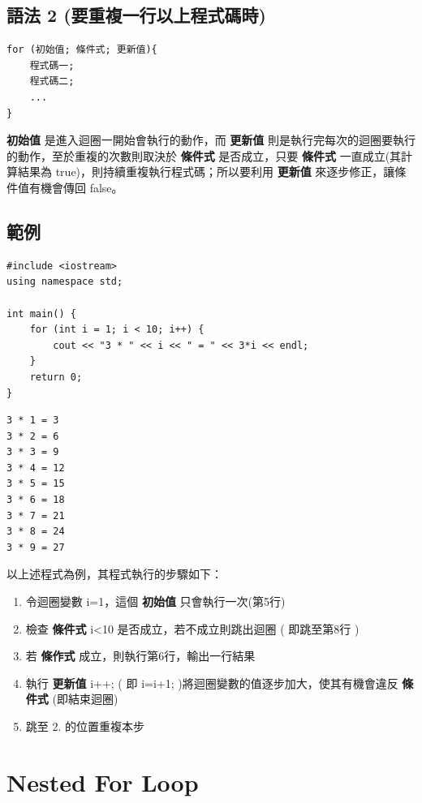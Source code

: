 \documentclass[12pt,a4paper]{article}
\begin{document}
\subsection{語法 2 (要重複一行以上程式碼時)}
\label{sec:orgc0b41c1}
\lstset{breaklines=true,language=cpp,label= ,caption= ,captionpos=b,firstnumber=1,numbers=left}
\begin{lstlisting}
for (初始值; 條件式; 更新值){
    程式碼一;
    程式碼二;
    ...
}
\end{lstlisting}

\textbf{初始值} 是進入迴圈一開始會執行的動作，而 \textbf{更新值} 則是執行完每次的迴圈要執行的動作，至於重複的次數則取決於 \textbf{條件式} 是否成立，只要 \textbf{條件式} 一直成立(其計算結果為 true)，則持續重複執行程式碼；所以要利用 \textbf{更新值} 來逐步修正，讓條件值有機會傳回 false。
\subsection{範例}
\label{sec:org0c37b0b}
\lstset{breaklines=true,language=cpp,label= ,caption= ,captionpos=b,firstnumber=1,numbers=left}
\begin{lstlisting}
#include <iostream>
using namespace std;

int main() {
    for (int i = 1; i < 10; i++) {
        cout << "3 * " << i << " = " << 3*i << endl;
    }
    return 0;
}
\end{lstlisting}

\begin{verbatim}
3 * 1 = 3
3 * 2 = 6
3 * 3 = 9
3 * 4 = 12
3 * 5 = 15
3 * 6 = 18
3 * 7 = 21
3 * 8 = 24
3 * 9 = 27
\end{verbatim}


以上述程式為例，其程式執行的步驟如下：
\begin{enumerate}
\item 令迴圈變數 i=1，這個 \textbf{初始值} 只會執行一次(第5行)
\item 檢查 \textbf{條件式} i<10 是否成立，若不成立則跳出迴圈 ( 即跳至第8行 )
\item 若 \textbf{條作式} 成立，則執行第6行，輸出一行結果
\item 執行 \textbf{更新值} i++; ( 即 i=i+1; )將迴圈變數的值逐步加大，使其有機會違反 \textbf{條件式} (即結束迴圈)
\item 跳至 2. 的位置重複本步
\end{enumerate}

\section{Nested For Loop}
\label{cpp_nested_for}
\end{document}
